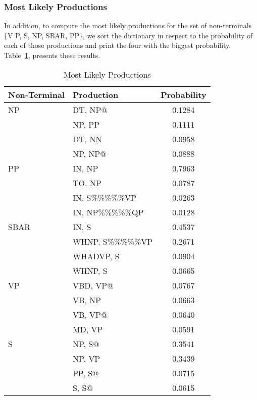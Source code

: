 \documentclass[a4paper,11pt]{article}
\begin{document}
\subsubsection{Most Likely Productions}
In addition, to compute the most likely productions for the set of non-terminals \{V P, S, NP, SBAR, PP\}, we sort the dictionary in respect to the probability of each of those productions and print the four with the biggest probability. Table~\ref{most}, presents these results.
\begin{table}[h!]
\caption{Most Likely Productions}
\label{most}
\begin{center}
\begin{scriptsize}
    \begin{tabular}{l l c}
    \hline
    \hline
    \textbf{Non-Terminal} & \textbf{Production} & \textbf{Probability} \\ \hline
	NP & DT, NP@ & 0.1284 \\
	&NP, PP &0.1111\\
	&DT, NN &0.0958\\
	&NP, NP@ &0.0888\vspace{0.1cm} \\
	PP & IN, NP & 0.7963 \\
	&TO, NP &0.0787\\
	&IN, S\%\%\%\%\%VP &0.0263\\
	&IN, NP\%\%\%\%\%QP& 0.0128\vspace{0.1cm} \\
	SBAR & IN, S & 0.4537 \\
	&WHNP, S\%\%\%\%\%VP& 0.2671\\
	&WHADVP, S &0.0904\\
	&WHNP, S &0.0665\vspace{0.1cm} \\
	VP & VBD, VP@  &0.0767 \\
	&VB, NP &0.0663\\
	&VB, VP@& 0.0640\\
	&MD, VP &0.0591\vspace{0.1cm} \\
	S & NP, S@ & 0.3541 \\
	&NP, VP& 0.3439 \\
	&PP, S@ & 0.0715 \\
	&S, S@& 0.0615 \\
  \hline
  \end{tabular}
  \end{scriptsize}
  \end{center}
\end{table}
\end{document}
